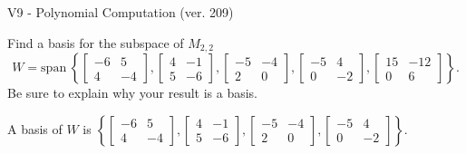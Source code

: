 \begin{exercise}
  \begin{exerciseTitle}V9 - Polynomial Computation (ver. 209)\end{exerciseTitle}
  \begin{exerciseStatement}
    Find a basis for the subspace of \(M_{2,2}\) 
\[W=\mathrm{span}\ \left\{\left[\begin{array}{cc}
-6 & 5 \\
4 & -4
\end{array}\right] , \left[\begin{array}{cc}
4 & -1 \\
5 & -6
\end{array}\right] , \left[\begin{array}{cc}
-5 & -4 \\
2 & 0
\end{array}\right] , \left[\begin{array}{cc}
-5 & 4 \\
0 & -2
\end{array}\right] , \left[\begin{array}{cc}
15 & -12 \\
0 & 6
\end{array}\right]\right\}.\]
 Be sure to explain why your result is a basis.


  \end{exerciseStatement}
  \begin{exerciseAnswer}
   A basis of \(W\) is  \(\left\{\left[\begin{array}{cc}
-6 & 5 \\
4 & -4
\end{array}\right] , \left[\begin{array}{cc}
4 & -1 \\
5 & -6
\end{array}\right] , \left[\begin{array}{cc}
-5 & -4 \\
2 & 0
\end{array}\right] , \left[\begin{array}{cc}
-5 & 4 \\
0 & -2
\end{array}\right]\right\}\).
  


  \end{exerciseAnswer}
\end{exercise}